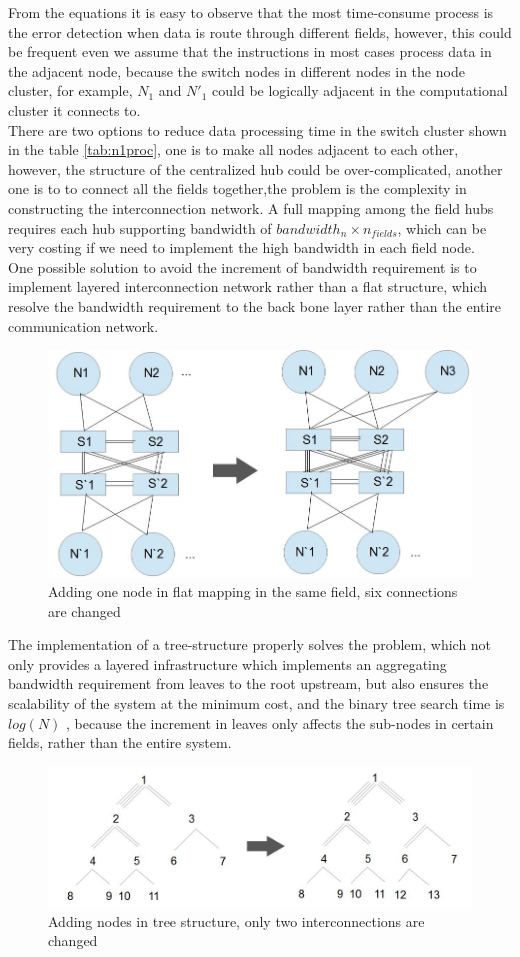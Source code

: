 \documentclass[11pt,openright,a4paper]{report}
\begin{document}
From the equations it is easy to observe that the most time-consume process is the error detection when data is route through different fields, however, this could be frequent even we assume that the instructions in most cases process data in the adjacent node, because the switch nodes in different nodes in the node cluster, for example, $N_{1}$ and ${N}'_{1}$ could be logically adjacent in the computational cluster it connects to.\\
There are two options to reduce data processing time in the switch cluster shown in the table \ref{tab:n1proc}, one is to make all nodes adjacent to each other, however, the structure of the centralized hub could be over-complicated, another one is to to connect all the fields together,the problem is the complexity in constructing the interconnection network. A full mapping among the field hubs requires each hub supporting bandwidth of $bandwidth_{n}\times n_{fields}$, which can be very costing if we need to implement the high bandwidth in each field node.\\
One possible solution to avoid the increment of bandwidth requirement is to implement layered interconnection network rather than a flat structure, which resolve the bandwidth requirement to the back bone layer rather than the entire communication network. \\
\begin{figure}[H]
	\centering
    \includegraphics[width=0.5\linewidth]{picture/flat_addNode.JPG}
    \caption{Adding one node in flat mapping in the same field, six connections are changed}
    \label{fig:flatadd}
\end{figure}
The implementation of a tree-structure properly solves the problem, which not only provides a layered infrastructure which implements an aggregating bandwidth requirement from leaves to the root upstream, but also ensures the scalability of the system at the minimum cost, and the binary tree search time is $log(N)$ \cite{ellis1980concurrent}, because the increment in leaves only affects the sub-nodes in certain fields, rather than the entire system.\\
\begin{figure}[H]
	\centering
    \includegraphics[width=0.6\linewidth]{picture/tree_addNodes.jpg}
    \caption{Adding nodes in tree structure, only two interconnections are changed}
    \label{fig:addnode}
\end{figure}
\end{document}
